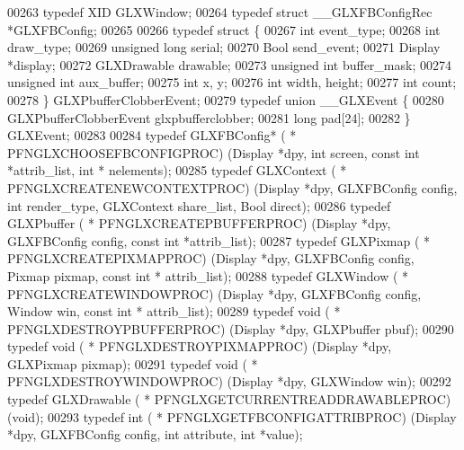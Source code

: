 \begin{DoxyCode}
00263 \textcolor{keyword}{typedef} XID GLXWindow;
00264 \textcolor{keyword}{typedef} \textcolor{keyword}{struct }\_\_GLXFBConfigRec *GLXFBConfig;
00265 
00266 \textcolor{keyword}{typedef} \textcolor{keyword}{struct }\{
00267   \textcolor{keywordtype}{int} event_type; 
00268   \textcolor{keywordtype}{int} draw_type; 
00269   \textcolor{keywordtype}{unsigned} \textcolor{keywordtype}{long} serial; 
00270   Bool send_event; 
00271   Display *display; 
00272   GLXDrawable drawable; 
00273   \textcolor{keywordtype}{unsigned} \textcolor{keywordtype}{int} buffer_mask; 
00274   \textcolor{keywordtype}{unsigned} \textcolor{keywordtype}{int} aux_buffer; 
00275   \textcolor{keywordtype}{int} x, y; 
00276   \textcolor{keywordtype}{int} width, height; 
00277   \textcolor{keywordtype}{int} count; 
00278 \} GLXPbufferClobberEvent;
00279 \textcolor{keyword}{typedef} \textcolor{keyword}{union }__GLXEvent \{
00280   GLXPbufferClobberEvent glxpbufferclobber; 
00281   \textcolor{keywordtype}{long} pad[24]; 
00282 \} GLXEvent;
00283 
00284 \textcolor{keyword}{typedef} GLXFBConfig* ( * PFNGLXCHOOSEFBCONFIGPROC) (Display *dpy, \textcolor{keywordtype}{int} screen, \textcolor{keyword}{const} \textcolor{keywordtype}{int} *attrib\_list, \textcolor{keywordtype}{int} *
      nelements);
00285 \textcolor{keyword}{typedef} GLXContext ( * PFNGLXCREATENEWCONTEXTPROC) (Display *dpy, GLXFBConfig config, \textcolor{keywordtype}{int} render\_type, 
      GLXContext share\_list, Bool direct);
00286 \textcolor{keyword}{typedef} GLXPbuffer ( * PFNGLXCREATEPBUFFERPROC) (Display *dpy, GLXFBConfig config, \textcolor{keyword}{const} \textcolor{keywordtype}{int} *attrib\_list);
00287 \textcolor{keyword}{typedef} GLXPixmap ( * PFNGLXCREATEPIXMAPPROC) (Display *dpy, GLXFBConfig config, Pixmap pixmap, \textcolor{keyword}{const} \textcolor{keywordtype}{int} *
      attrib\_list);
00288 \textcolor{keyword}{typedef} GLXWindow ( * PFNGLXCREATEWINDOWPROC) (Display *dpy, GLXFBConfig config, Window win, \textcolor{keyword}{const} \textcolor{keywordtype}{int} *
      attrib\_list);
00289 \textcolor{keyword}{typedef} void ( * PFNGLXDESTROYPBUFFERPROC) (Display *dpy, GLXPbuffer pbuf);
00290 \textcolor{keyword}{typedef} void ( * PFNGLXDESTROYPIXMAPPROC) (Display *dpy, GLXPixmap pixmap);
00291 \textcolor{keyword}{typedef} void ( * PFNGLXDESTROYWINDOWPROC) (Display *dpy, GLXWindow win);
00292 \textcolor{keyword}{typedef} GLXDrawable ( * PFNGLXGETCURRENTREADDRAWABLEPROC) (void);
00293 \textcolor{keyword}{typedef} int ( * PFNGLXGETFBCONFIGATTRIBPROC) (Display *dpy, GLXFBConfig config, \textcolor{keywordtype}{int} attribute, \textcolor{keywordtype}{int} *value);

\end{DoxyCode}
